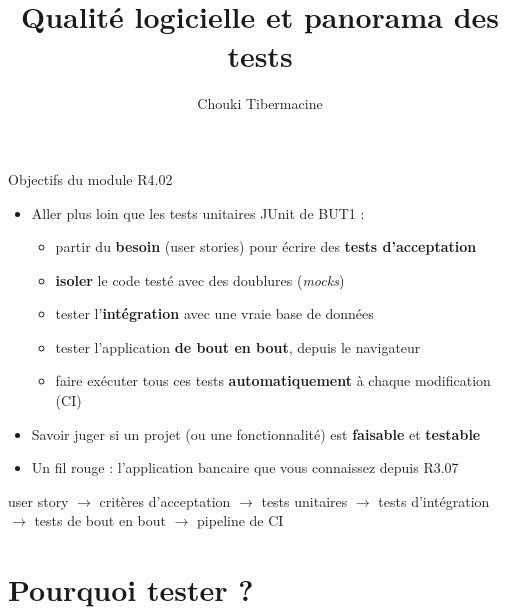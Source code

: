 \documentclass[aspectratio=169,10pt]{beamer}
\title{Qualité logicielle et panorama des tests}
\author[C. Tibermacine]{Chouki Tibermacine}
\date{}
\begin{document}

\begin{frame}{Objectifs du module R4.02}
  \begin{itemize}
    \item Aller plus loin que les tests unitaires JUnit de BUT1 :
      \begin{itemize}
        \item partir du \textbf{besoin} (user stories) pour écrire des \textbf{tests d'acceptation}
        \item \textbf{isoler} le code testé avec des doublures (\textit{mocks})
        \item tester l'\textbf{intégration} avec une vraie base de données
        \item tester l'application \textbf{de bout en bout}, depuis le navigateur
        \item faire exécuter tous ces tests \textbf{automatiquement} à chaque modification (CI)
      \end{itemize}
    \item Savoir juger si un projet (ou une fonctionnalité) est \textbf{faisable} et \textbf{testable}
    \item Un fil rouge : l'application bancaire que vous connaissez depuis R3.07
  \end{itemize}
  \vspace{3mm}
  \begin{datacard}
    \small user story $\rightarrow$ critères d'acceptation $\rightarrow$ tests unitaires $\rightarrow$ tests d'intégration $\rightarrow$ tests de bout en bout $\rightarrow$ pipeline de CI
  \end{datacard}
\end{frame}

\section{Pourquoi tester ?}
\end{document}
